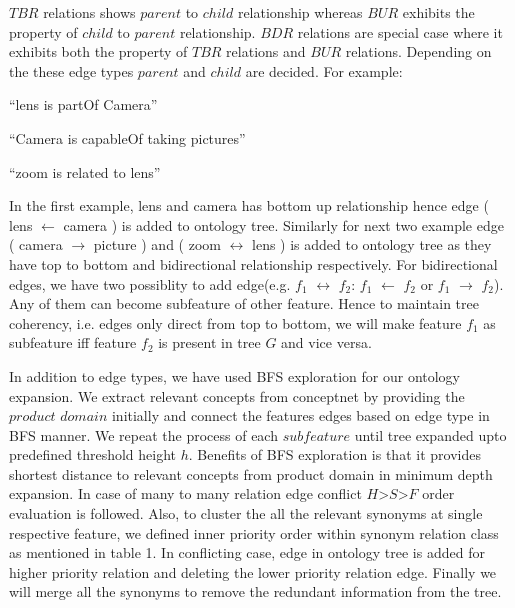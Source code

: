 $TBR$ relations shows $parent$ to $child$ relationship whereas $BUR$ exhibits the property of $child$ to $parent$ relationship. $BDR$ relations are special case where it exhibits both the property of $TBR$ relations and $BUR$ relations. Depending on the these edge types $parent$ and $child$ are decided. For example:

``lens is partOf Camera''

``Camera is capableOf taking pictures''

``zoom is related to lens''

In the first example, lens and camera has bottom up relationship hence edge ( lens $\leftarrow$ camera ) is added to ontology tree. Similarly for next two example edge ( camera $\rightarrow$ picture ) and ( zoom $\leftrightarrow$ lens ) is added to ontology tree as they have top to bottom and bidirectional relationship respectively. For bidirectional edges, we have two possiblity to add edge(e.g. $f_{1}$ $\leftrightarrow $ $f_{2}$: $f_{1}$ $\leftarrow$ $f_{2}$ or $f_{1}$ $\rightarrow$ $f_{2}$). Any of them can become subfeature of other feature. Hence to maintain tree coherency, i.e. edges only direct from top to bottom, we will make feature $f_{1}$ as subfeature iff feature $f_{2}$ is present in tree $G$ and vice versa. 

In addition to edge types, we have used BFS exploration for our ontology expansion. We extract relevant concepts from conceptnet by providing the $product$ $domain$ initially and connect the features edges based on edge type in BFS manner. We repeat the process of each $subfeature$ until tree expanded upto predefined threshold height $h$. Benefits of BFS exploration is that it provides shortest distance to relevant concepts from product domain in minimum depth expansion. In case of many to many relation edge conflict $H$>$S$>$F$ order evaluation is followed. Also, to cluster the all the relevant synonyms at single respective feature, we defined inner priority order within synonym relation class as mentioned in table 1. In conflicting case, edge in ontology tree is added for higher priority relation and deleting the lower priority relation edge. Finally we will merge all the synonyms to remove the redundant information from the tree.


